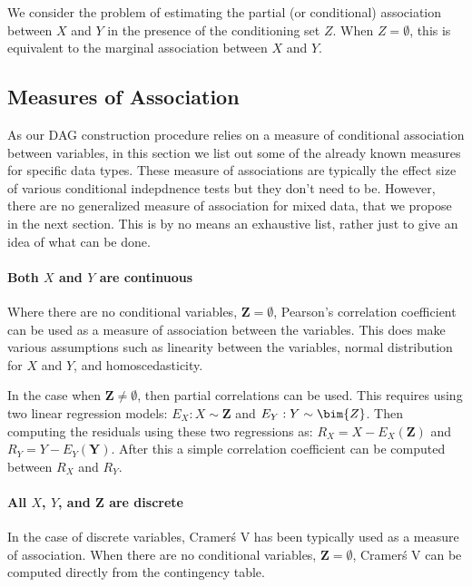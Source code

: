 \documentclass[letterpaper]{article} %
\begin{document}
We consider the problem of estimating the partial (or conditional) association
between $ X $ and $ Y $ in the presence of the conditioning set $ Z $. When $ Z
= \emptyset $, this is equivalent to the marginal association between $ X $ and
$ Y $.


\subsection{Measures of Association}
As our DAG construction procedure relies on a measure of conditional
association between variables, in this section we list out some of the already
known measures for specific data types. These measure of associations are
typically the effect size of various conditional indepdnence tests but they
don't need to be. However, there are no generalized measure of association for
mixed data, that we propose in the next section. This is by no means an
exhaustive list, rather just to give an idea of what can be done.

\paragraph{Both $ X $ and $ Y $ are continuous}
Where there are no conditional variables, $ \bm{Z} = \emptyset $, Pearson's
correlation coefficient can be used as a measure of association between the
variables. This does make various assumptions such as linearity between the
variables, normal distribution for $ X $ and $ Y $, and homoscedasticity.

In the case when $ \bm{Z} \neq \emptyset $, then partial correlations can be
used. This requires using two linear regression models: $ E_X: X \sim \bm{Z} $
and $ E_Y: Y \sim \bim{Z} $. Then computing the residuals using these two
regressions as: $ R_X = X - E_X(\bm{Z}) $ and $ R_Y = Y - E_Y(\bm{Y}) $. After
this a simple correlation coefficient can be computed between $ R_X $ and $ R_Y $.

\paragraph{All $ X $, $ Y $, and $ \bm{Z} $ are discrete}

In the case of discrete variables, Cramer\'s V has been typically used as a
measure of association. When there are no conditional variables, $ \bm{Z} = \emptyset $,
Cramer\'s V can be computed directly from the contingency table.
\end{document}
